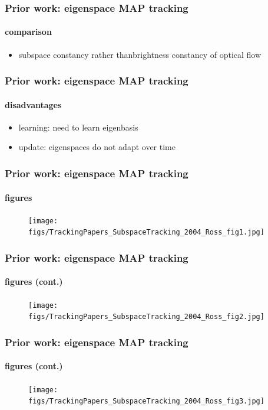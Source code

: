 \begin{frame}
\frametitle{Prior work: eigenspace MAP tracking}
\framesubtitle{comparison}
\logoCSIPCPL\mypagenum
	\begin{itemize}
		\item {\color{blue}subspace constancy} rather thanbrightness constancy of optical flow
	\end{itemize}
\end{frame}


\begin{frame}
\frametitle{Prior work: eigenspace MAP tracking}
\framesubtitle{disadvantages}
\logoCSIPCPL\mypagenum
	\begin{itemize}
		\item {\color{red}learning}: need to learn eigenbasis
		\item {\color{red}update}: eigenspaces do not adapt over time
	\end{itemize}
\end{frame}



\begin{frame}
\frametitle{Prior work: eigenspace MAP tracking}
\framesubtitle{figures}
\logoCSIPCPL\mypagenum
	\begin{figure}
		\texttt{[image: figs/TrackingPapers\_SubspaceTracking\_2004\_Ross\_fig1.jpg]}
	\end{figure}
\end{frame}


\begin{frame}
\frametitle{Prior work: eigenspace MAP tracking}
\framesubtitle{figures (cont.)}
\logoCSIPCPL\mypagenum
	\begin{figure}
		\texttt{[image: figs/TrackingPapers\_SubspaceTracking\_2004\_Ross\_fig2.jpg]}
	\end{figure}
\end{frame}


\begin{frame}
\frametitle{Prior work: eigenspace MAP tracking}
\framesubtitle{figures (cont.)}
\logoCSIPCPL\mypagenum
	\begin{figure}
		\texttt{[image: figs/TrackingPapers\_SubspaceTracking\_2004\_Ross\_fig3.jpg]}
	\end{figure}
\end{frame}

